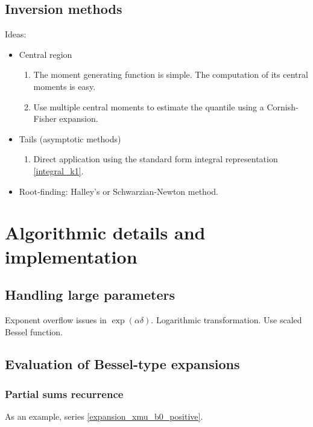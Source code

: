 \documentclass[10pt,a4paper,oneside]{article}
\numberwithin{equation}{section}
\begin{document}
\subsection{Inversion methods}
Ideas:
\begin{itemize}
\item Central region
\begin{enumerate}
\item The moment generating function is simple. The computation of its central moments is easy.
\item Use multiple central moments to estimate the quantile using a Cornish-Fisher expansion.
\end{enumerate}
\item Tails (asymptotic methods) \cite[\S 42]{Temme2015}
\begin{enumerate}
\item Direct application using the standard form integral representation \eqref{integral_k1}.
\end{enumerate}
\item Root-finding: Halley's or Schwarzian-Newton method.
\end{itemize}

\section{Algorithmic details and implementation}
\subsection{Handling large parameters}
Exponent overflow issues in $\exp(\alpha \delta)$. Logarithmic transformation. Use scaled Bessel function.
\subsection{Evaluation of Bessel-type expansions}\label{subsection_evaluation_bessel_expansions}

\subsubsection{Partial sums recurrence}
As an example, series \eqref{expansion_xmu_b0_positive}.
\end{document}
